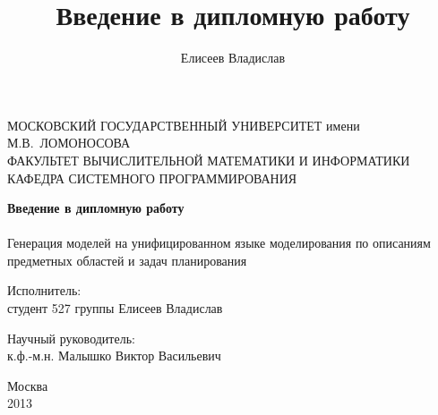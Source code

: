 \documentclass[a4paper,14pt]{extreport}
\title{Введение в дипломную работу}
\author{Елисеев Владислав}
\begin{document}
\begin{titlepage}

\begin{center}
{\small
МОСКОВСКИЙ ГОСУДАРСТВЕННЫЙ УНИВЕРСИТЕТ имени М.В.~ЛОМОНОСОВА \\
ФАКУЛЬТЕТ ВЫЧИСЛИТЕЛЬНОЙ МАТЕМАТИКИ И ИНФОРМАТИКИ \\
КАФЕДРА СИСТЕМНОГО ПРОГРАММИРОВАНИЯ
}
\end{center}

\vfill
\vfill
\begin{center}
\Large{\textbf{Введение в дипломную работу}} \\
~\\
\Large{Генерация моделей на унифицированном языке моделирования по описаниям предметных областей и задач планирования}
\end{center}
\vfill
\vfill
\vfill
\vfill
\begin{flushright}
Исполнитель: \\
студент 527 группы Елисеев Владислав
\end{flushright}
\vfill
\begin{flushright}
Научный руководитель: \\
к.ф.-м.н. Малышко Виктор Васильевич
\end{flushright}
  
\vfill
\vfill
\vfill
\vfill
\begin{center}
  Москва\\
  2013
\end{center}  
\end{titlepage}



\setcounter{page}{1}
\end{document}
